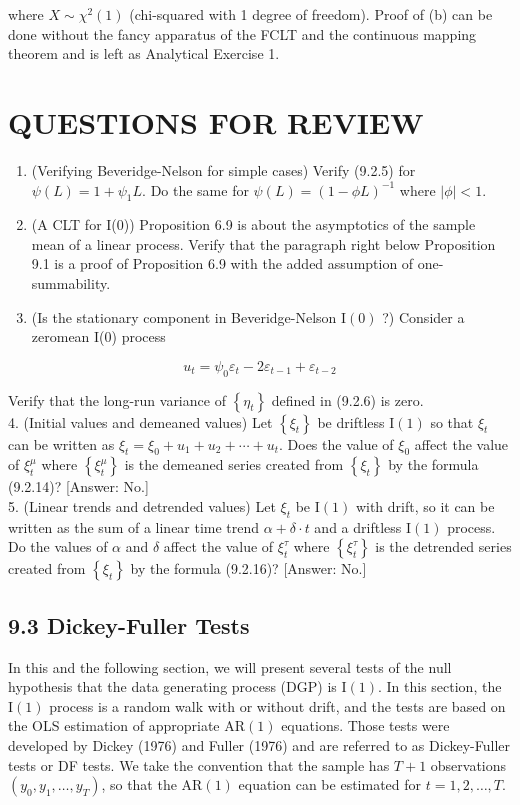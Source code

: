 \documentclass[10pt]{article}
\begin{document}
where $X \sim \chi^{2}(1)$ (chi-squared with 1 degree of freedom). Proof of (b) can be done without the fancy apparatus of the FCLT and the continuous mapping theorem and is left as Analytical Exercise 1.

\section*{QUESTIONS FOR REVIEW}
\begin{enumerate}
  \item (Verifying Beveridge-Nelson for simple cases) Verify (9.2.5) for $\psi(L)=1+ \psi_{1} L$. Do the same for $\psi(L)=(1-\phi L)^{-1}$ where $|\phi|<1$.
  \item (A CLT for I(0)) Proposition 6.9 is about the asymptotics of the sample mean of a linear process. Verify that the paragraph right below Proposition 9.1 is a proof of Proposition 6.9 with the added assumption of one-summability.
  \item (Is the stationary component in Beveridge-Nelson $\mathrm{I}(0)$ ?) Consider a zeromean I(0) process
\end{enumerate}

$$
u_{t}=\psi_{0} \varepsilon_{t}-2 \varepsilon_{t-1}+\varepsilon_{t-2}
$$

Verify that the long-run variance of $\left\{\eta_{t}\right\}$ defined in (9.2.6) is zero.\\
4. (Initial values and demeaned values) Let $\left\{\xi_{t}\right\}$ be driftless $\mathrm{I}(1)$ so that $\xi_{t}$ can be written as $\xi_{t}=\xi_{0}+u_{1}+u_{2}+\cdots+u_{t}$. Does the value of $\xi_{0}$ affect the value of $\xi_{t}^{\mu}$ where $\left\{\xi_{t}^{\mu}\right\}$ is the demeaned series created from $\left\{\xi_{t}\right\}$ by the formula (9.2.14)? [Answer: No.]\\
5. (Linear trends and detrended values) Let $\xi_{t}$ be $\mathrm{I}(1)$ with drift, so it can be written as the sum of a linear time trend $\alpha+\delta \cdot t$ and a driftless $\mathrm{I}(1)$ process. Do the values of $\alpha$ and $\delta$ affect the value of $\xi_{t}^{\tau}$ where $\left\{\xi_{t}^{\tau}\right\}$ is the detrended series created from $\left\{\xi_{t}\right\}$ by the formula (9.2.16)? [Answer: No.]

\subsection*{9.3 Dickey-Fuller Tests}
In this and the following section, we will present several tests of the null hypothesis that the data generating process (DGP) is $\mathrm{I}(1)$. In this section, the $\mathrm{I}(1)$ process is a random walk with or without drift, and the tests are based on the OLS estimation of appropriate $\mathrm{AR}(1)$ equations. Those tests were developed by Dickey (1976) and Fuller (1976) and are referred to as Dickey-Fuller tests or DF tests. We take the convention that the sample has $T+1$ observations $\left(y_{0}, y_{1}, \ldots, y_{T}\right)$, so that the $\mathrm{AR}(1)$ equation can be estimated for $t=1,2, \ldots, T$.
\end{document}
